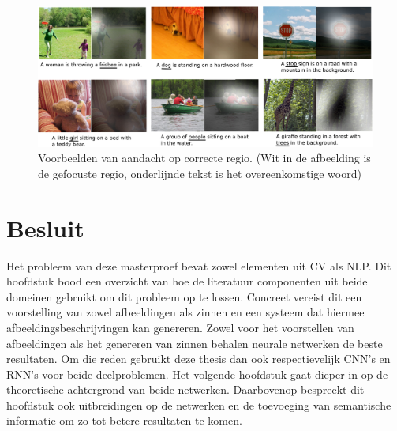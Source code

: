 \begin{figure}[tb]
	\centering
	\includegraphics[width=\linewidth]{Images/good_Xu.pdf}
	\caption[Voorbeelden van aandacht op correcte regio.]{Voorbeelden van aandacht op correcte regio. (Wit in de afbeelding is de gefocuste regio, onderlijnde tekst is het overeenkomstige woord)~\cite{Xu2015}}
	\label{fig:attention-example}
\end{figure}


\section{Besluit}
Het probleem van deze masterproef bevat zowel elementen uit CV als NLP. Dit hoofdstuk bood een overzicht van hoe de literatuur componenten uit beide domeinen gebruikt om dit probleem op te lossen. Concreet vereist dit een voorstelling van zowel afbeeldingen als zinnen en een systeem dat hiermee afbeeldingsbeschrijvingen kan genereren. Zowel voor het voorstellen van afbeeldingen als het genereren van zinnen behalen neurale netwerken de beste resultaten. Om die reden gebruikt deze thesis dan ook respectievelijk CNN's en RNN's voor beide deelproblemen. Het volgende hoofdstuk gaat dieper in op de theoretische achtergrond van beide netwerken. Daarbovenop bespreekt dit hoofdstuk ook uitbreidingen op de netwerken en de toevoeging van semantische informatie om zo tot betere resultaten te komen.

